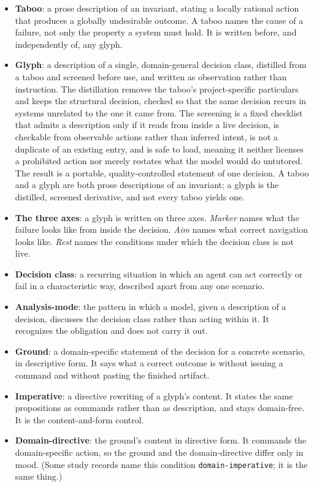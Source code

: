 \documentclass[11pt,a4paper]{article}
\begin{document}
\begin{itemize}
  \item \textbf{Taboo}: a prose description of an invariant, stating a locally rational
    action that produces a globally undesirable outcome. A taboo names the cause of a
    failure, not only the property a system must hold. It is written before, and
    independently of, any glyph.
  \item \textbf{Glyph}: a description of a single, domain-general decision class,
    distilled from a taboo and screened before use, and written as observation rather
    than instruction. The distillation removes the taboo's project-specific particulars
    and keeps the structural decision, checked so that the same decision recurs in
    systems unrelated to the one it came from. The screening is a fixed checklist that
    admits a description only if it reads from inside a live decision, is checkable from
    observable actions rather than inferred intent, is not a duplicate of an existing
    entry, and is safe to load, meaning it neither licenses a prohibited action nor
    merely restates what the model would do untutored. The result is a portable,
    quality-controlled statement of one decision. A taboo and a glyph are both prose
    descriptions of an invariant; a glyph is the distilled, screened derivative, and not
    every taboo yields one.
  \item \textbf{The three axes}: a glyph is written on three axes. \emph{Marker} names
    what the failure looks like from inside the decision. \emph{Aim} names what correct
    navigation looks like. \emph{Rest} names the conditions under which the decision
    class is not live.
  \item \textbf{Decision class}: a recurring situation in which an agent can act
    correctly or fail in a characteristic way, described apart from any one scenario.
  \item \textbf{Analysis-mode}: the pattern in which a model, given a description of a
    decision, discusses the decision class rather than acting within it. It recognizes
    the obligation and does not carry it out.
  \item \textbf{Ground}: a domain-specific statement of the decision for a concrete
    scenario, in descriptive form. It says what a correct outcome is without issuing a
    command and without pasting the finished artifact.
  \item \textbf{Imperative}: a directive rewriting of a glyph's content. It states the
    same propositions as commands rather than as description, and stays domain-free. It
    is the content-and-form control.
  \item \textbf{Domain-directive}: the ground's content in directive form. It commands the
    domain-specific action, so the ground and the domain-directive differ only in mood.
    (Some study records name this condition \texttt{domain-imperative}; it is the same
    thing.)
\end{itemize}
\end{document}

